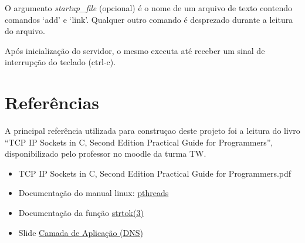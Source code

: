 \documentclass[12pt]{article}
\begin{document}
\noindent O argumento \emph{startup\_file} (opcional) é o nome de um arquivo de texto contendo comandos `add' e `link'. Qualquer outro comando é desprezado durante a leitura do arquivo. \par

\noindent Após inicialização do servidor, o mesmo executa até receber um sinal de interrupção do teclado (ctrl-c).

\newpage

\section{Referências}

A principal referência utilizada para construçao deste projeto foi a leitura do livro ``TCP IP Sockets in C, Second Edition Practical Guide for Programmers'', disponibilizado pelo professor no moodle da turma TW. \par


\begin{itemize}
    \item TCP IP Sockets in C, Second Edition Practical Guide for Programmers.pdf
    \item Documentação do manual linux: \href{https://man7.org/linux/man-pages/man7/pthreads.7.html}{pthreads}
    \item Documentação da função \href{https://linux.die.net/man/3/strtok}{strtok(3)}
    \item Slide \href{https://docente.ifrn.edu.br/diegopereira/disciplinas/2012/aplicacoes-de-redes-de-computadores/aula-15-camada-de-aplicacao-dns/view}{Camada de Aplicação (DNS)}
\end{itemize}
\end{document}
